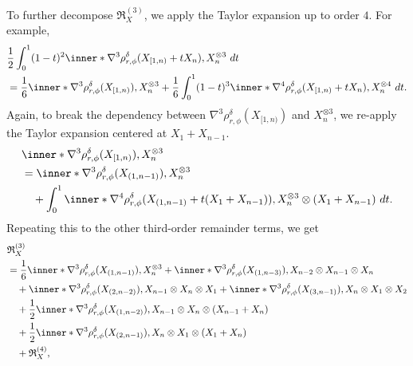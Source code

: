 \documentclass[aos]{imsart}
\begin{document}
\begin{appendix}
To further decompose $\mathfrak{R}_X^{(3)}$, we apply the Taylor expansion up to order $4$. For example, 
\begin{equation*}
\begin{aligned}
    & \frac{1}{2} \int_0^1 (1-t)^2 \inner*{
    \nabla^3 \rho_{r,\phi}^\delta(X_{[1,n)} + t X_n), X_n^{\otimes 3}} ~dt \\
    & = \frac{1}{6} \inner*{ \nabla^3 \rho_{r,\phi}^\delta(X_{[1,n)}), X_n^{\otimes 3}}
    + \frac{1}{6} \int_0^1 (1-t)^3 \inner*{
    \nabla^4 \rho_{r,\phi}^\delta(X_{[1,n)} + t X_n), X_n^{\otimes 4}} ~dt.
\end{aligned}
\end{equation*}
Again, to break the dependency between $\nabla^3 \rho_{r,\phi}^\delta(X_{[1,n)})$ and $X_n^{\otimes 3}$, we re-apply the Taylor expansion centered at $X_1 + X_{n-1}$.
\begin{equation*}
\begin{aligned}
    & \inner*{ \nabla^3 \rho_{r,\phi}^\delta(X_{[1,n)}), X_n^{\otimes 3}} \\
    & = \inner*{ \nabla^3 \rho_{r,\phi}^\delta(X_{(1,n-1)}), X_n^{\otimes 3}} \\
    & \quad + \int_0^1 \inner*{
    \nabla^4 \rho_{r,\phi}^\delta(X_{(1,n-1)} + t (X_1+X_{n-1})), X_n^{\otimes 3} \otimes (X_1 + X_{n-1})} ~dt.
\end{aligned}
\end{equation*}
Repeating this to the other third-order remainder terms, we get
\begin{equation*}
\begin{aligned}
    & \mathfrak{R}_X^{(3)} \\
    & = \frac{1}{6} \inner*{\nabla^3 \rho_{r,\phi}^\delta(X_{(1,n-1)}), X_n^{\otimes 3}}
    + \inner*{\nabla^3 \rho_{r,\phi}^\delta(X_{(1,n-3)}), X_{n-2} \otimes X_{n-1} \otimes X_n} \\
    & \quad + \inner*{\nabla^3 \rho_{r,\phi}^\delta(X_{(2,n-2)}),  X_{n-1} \otimes X_{n} \otimes X_1} 
    + \inner*{\nabla^3 \rho_{r,\phi}^\delta(X_{(3,n-1)}),  X_{n} \otimes X_{1} \otimes X_2} \\
    & \quad + \frac{1}{2} \inner*{
        \nabla^3 \rho_{r,\phi}^\delta(X_{(1,n-2)}), 
        X_{n-1} \otimes X_n \otimes (X_{n-1} + X_n)
    } \\
    & \quad + \frac{1}{2} \inner*{
        \nabla^3 \rho_{r,\phi}^\delta(X_{(2,n-1)}), 
        X_{n} \otimes X_1 \otimes (X_1 + X_n)
    } \\
    & \quad + \mathfrak{R}_X^{(4)},
\end{aligned}

\end{equation*}
\end{appendix}
\end{document}
